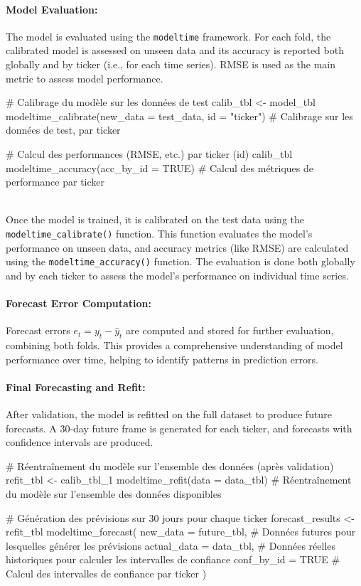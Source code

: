 \documentclass[12pt]{report}
\begin{document}
\paragraph{Model Evaluation:}
The model is evaluated using the \texttt{modeltime} framework. For each fold, the calibrated model is assessed on unseen data and its accuracy is reported both globally and by ticker (i.e., for each time series). RMSE is used as the main metric to assess model performance.\\

\begin{code}
# Calibrage du modèle sur les données de test
calib_tbl <- model_tbl %
  modeltime_calibrate(new_data = test_data, id = "ticker")  # Calibrage sur les données de test, par ticker

# Calcul des performances (RMSE, etc.) par ticker (id)
calib_tbl %
  modeltime_accuracy(acc_by_id = TRUE)  # Calcul des métriques de performance par ticker
\end{code}\\

Once the model is trained, it is calibrated on the test data using the \texttt{modeltime\_calibrate()} function. This function evaluates the model's performance on unseen data, and accuracy metrics (like RMSE) are calculated using the \texttt{modeltime\_accuracy()} function. The evaluation is done both globally and by each ticker to assess the model's performance on individual time series.

\paragraph{Forecast Error Computation:}
Forecast errors \( e_t = y_t - \hat{y}_t \) are computed and stored for further evaluation, combining both folds. This provides a comprehensive understanding of model performance over time, helping to identify patterns in prediction errors.

\paragraph{Final Forecasting and Refit:}
After validation, the model is refitted on the full dataset to produce future forecasts. A 30-day future frame is generated for each ticker, and forecasts with confidence intervals are produced.\\

\begin{code}
# Réentraînement du modèle sur l'ensemble des données (après validation)
refit_tbl <- calib_tbl_1 %
  modeltime_refit(data = data_tbl)  # Réentraînement du modèle sur l'ensemble des données disponibles

# Génération des prévisions sur 30 jours pour chaque ticker
forecast_results <- refit_tbl %
  modeltime_forecast(
    new_data = future_tbl,  # Données futures pour lesquelles générer les prévisions
    actual_data = data_tbl,  # Données réelles historiques pour calculer les intervalles de confiance
    conf_by_id = TRUE  # Calcul des intervalles de confiance par ticker
  )
\end{code}
\end{document}
